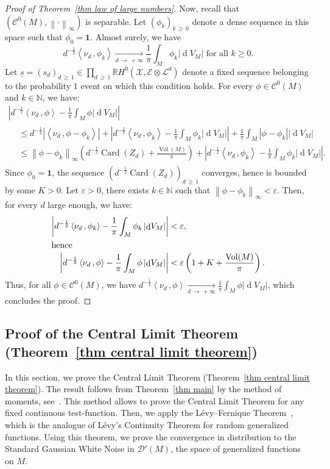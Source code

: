 \documentclass[10pt]{amsart}
\theoremstyle{definition}\newtheorem{defi}[theo]{Definition}\newtheorem{rema}[theo]{Remark}\newtheorem{exam}[theo]{Example}\newtheorem{exem}[theo]{Example}\newtheorem{nota}[theo]{Notation}
\DeclareMathOperator{\card}{Card}
\DeclareMathOperator{\dmesure}{d}
\DeclareMathOperator{\Vol}{Vol}
\newcommand{\D}{\mathcal{D}}
\newcommand{\E}{\mathcal{E}}
\newcommand{\X}{\mathcal{X}}
\renewcommand{\L}{\mathcal{L}}
\newcommand{\clC}{\mathcal{C}}
\newcommand{\N}{\mathbb{N}}
\newcommand{\R}{\mathbb{R}}
\newcommand{\bfun}{\mathbf{1}}
\newcommand{\norm}[1]{\left\lvert #1 \right\rvert}
\newcommand{\Norm}[1]{\left\lVert #1 \right\rVert}
\newcommand{\prsc}[2]{\left\langle #1\,, #2 \right\rangle}
\newcommand{\rmes}[1]{\norm{\dmesure\! V_{#1}}}
\newcommand{\vol}[1]{\Vol\!\left(#1\right)}
\renewcommand{\H}{H^0(\X,\E \otimes \L^d)}
\renewcommand{\epsilon}{\varepsilon}
\renewcommand{\geq}{\geqslant}
\renewcommand{\leq}{\leqslant}
\begin{document}
\begin{proof}[Proof of Theorem~\ref{thm law of large numbers}]
Now, recall that $(\clC^0(M),\Norm{\cdot}_\infty)$ is separable. Let $(\phi_k)_{k\,\geq\,0}$ denote a dense sequence in this space such that $\phi_0 =\bfun$. Almost surely, we have \[
d^{-\frac{1}{2}} \prsc{\nu_d}{\phi_k} \xrightarrow[d\,\to\,+\infty]{} \frac{1}{\pi} \int_M \phi_k \rmes{M}\text{ for all }k \geq 0.
\]
Let $\underline{s}=(s_d)_{d\,\geq\,1} \in \prod_{d\,\geq\,1} \R\H$ denote a fixed sequence belonging to the probability $1$ event on which this condition holds. For every $\phi \in \clC^0(M)$ and $k \in \N$, we have:
\begin{multline*}
\norm{d^{-\frac{1}{2}}\prsc{\nu_d}{\phi} - \frac{1}{\pi} \int_M \phi \rmes{M}}\\
\begin{aligned}
&\leq d^{-\frac{1}{2}}\norm{\prsc{\nu_d}{\phi-\phi_k}} + \norm{d^{-\frac{1}{2}}\prsc{\nu_d}{\phi_k} - \frac{1}{\pi} \int_M \phi_k \rmes{M}} + \frac{1}{\pi} \int_M \norm{\phi-\phi_k} \rmes{M}\\
&\leq \Norm{\phi-\phi_k}_\infty \left(d^{-\frac{1}{2}}\card(Z_d) + \frac{\vol{M}}{\pi}\right) + \norm{d^{-\frac{1}{2}}\prsc{\nu_d}{\phi_k} - \frac{1}{\pi} \int_M \phi_k \rmes{M}}.
\end{aligned}
\end{multline*}
Since $\phi_0=\bfun$, the sequence $(d^{-\frac{1}{2}}\card(Z_d))_{d\,\geq\,1}$ converges, hence is bounded by some $K >0$. Let $\epsilon >0$, there exists $k \in \N$ such that $\Norm{\phi-\phi_k}_\infty < \epsilon$. Then, for every $d$ large enough, we have:
\begin{align*}
\norm{d^{-\frac{1}{2}}\prsc{\nu_d}{\phi_k} - \frac{1}{\pi} \int_M \phi_k \rmes{M}} &< \epsilon,
\\
\intertext{hence}
\norm{d^{-\frac{1}{2}}\prsc{\nu_d}{\phi} - \frac{1}{\pi} \int_M \phi \rmes{M}} &< \epsilon \left(1 + K +\frac{\vol{M}}{\pi}\right).
\end{align*}
Thus, for all $\phi \in \clC^0(M)$, we have $d^{-\frac{1}{2}}\prsc{\nu_d}{\phi} \xrightarrow[d\,\to\,+\infty]{} \frac{1}{\pi} \int_M \phi \rmes{M}$, which concludes the proof.
\end{proof}



\subsection{Proof of the Central Limit Theorem (Theorem~\ref{thm central limit theorem})}\label{subsec proof of the CLT}

In this section, we prove the Central Limit Theorem (Theorem~\ref{thm central limit theorem}). The result follows from Theorem~\ref{thm main} by the method of moments, see~\cite[Chapter~30]{Bil1995}. This method allows to prove the Central Limit Theorem for any fixed continuous test-function. Then, we apply the Lévy--Fernique Theorem~\cite[Theorem~III.6.5]{Fer1967}, which is the analogue of Lévy's Continuity Theorem for random generalized functions. Using this theorem, we prove the convergence in distribution to the Standard Gaussian White Noise in $\D'(M)$, the space of generalized functions on $M$.
\vspace{6pt}
\end{document}
